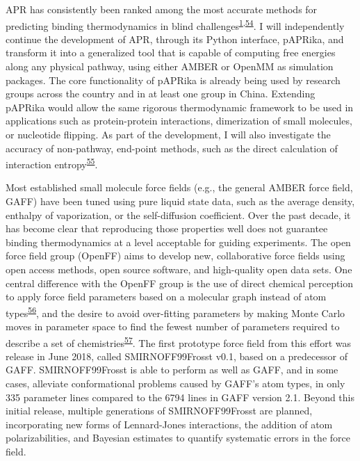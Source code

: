 \documentclass[11pt,notitlepage]{article}
\begin{document}
APR has consistently been ranked among the most accurate methods for
predicting binding thermodynamics in blind
challenges\textsuperscript{\protect\hyperlink{ref-BGsUYQln}{1},\protect\hyperlink{ref-GA1AFcUw}{54}}.
I will independently continue the development of APR, through its Python
interface, pAPRika, and transform it into a generalized tool that is
capable of computing free energies along any physical pathway, using
either AMBER or OpenMM as simulation packages. The core functionality of
pAPRika is already being used by research groups across the country and
in at least one group in China. Extending pAPRika would allow the same
rigorous thermodynamic framework to be used in applications such as
protein-protein interactions, dimerization of small molecules, or
nucleotide flipping. As part of the development, I will also investigate
the accuracy of non-pathway, end-point methods, such as the direct
calculation of interaction
entropy\textsuperscript{\protect\hyperlink{ref-gRfhPG7N}{55}}.

Most established small molecule force fields (e.g., the general AMBER
force field, GAFF) have been tuned using pure liquid state data, such as
the average density, enthalpy of vaporization, or the self-diffusion
coefficient. Over the past decade, it has become clear that reproducing
those properties well does not guarantee binding thermodynamics at a
level acceptable for guiding experiments. The open force field group
(OpenFF) aims to develop new, collaborative force fields using open
access methods, open source software, and high-quality open data sets.
One central difference with the OpenFF group is the use of direct
chemical perception to apply force field parameters based on a molecular
graph instead of atom
types\textsuperscript{\protect\hyperlink{ref-HlBr7NrU}{56}}, and the
desire to avoid over-fitting parameters by making Monte Carlo moves in
parameter space to find the fewest number of parameters required to
describe a set of
chemistries\textsuperscript{\protect\hyperlink{ref-13lTSBgHy}{57}}. The
first prototype force field from this effort was release in June 2018,
called SMIRNOFF99Frosst v0.1, based on a predecessor of GAFF.
SMIRNOFF99Frosst is able to perform as well as GAFF, and in some cases,
alleviate conformational problems caused by GAFF's atom types, in only
335 parameter lines compared to the 6794 lines in GAFF version 2.1.
Beyond this initial release, multiple generations of SMIRNOFF99Frosst
are planned, incorporating new forms of Lennard-Jones interactions, the
addition of atom polarizabilities, and Bayesian estimates to quantify
systematic errors in the force field.
\end{document}
